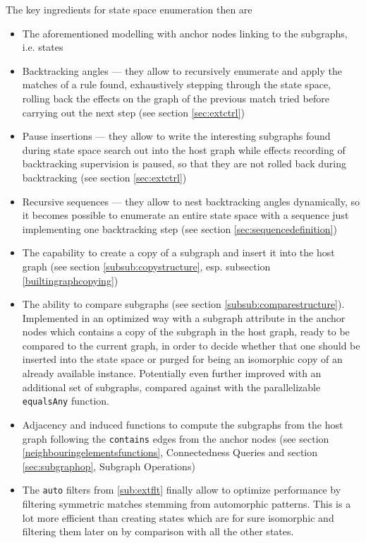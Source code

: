 The key ingredients for state space enumeration then are
\begin{itemize}
	\item The aforementioned modelling with anchor nodes linking to the subgraphs, i.e. states
	\item Backtracking angles --- they allow to recursively enumerate and apply the matches of a rule found, exhaustively stepping through the state space, rolling back the effects on the graph of the previous match tried before carrying out the next step (see section \ref{sec:extctrl})
	\item Pause insertions --- they allow to write the interesting subgraphs found during state space search out into the host graph while effects recording of backtracking supervision is paused, so that they are not rolled back during backtracking (see section \ref{sec:extctrl})
	\item Recursive sequences --- they allow to nest backtracking angles dynamically, so it becomes possible to enumerate an entire state space with a sequence just implementing one backtracking step (see section \ref{sec:sequencedefinition})
	\item The capability to create a copy of a subgraph and insert it into the host graph (see section \ref{subsub:copystructure}, esp. subsection \ref{builtingraphcopying})
	\item The ability to compare subgraphs (see section \ref{subsub:comparestructure}).
Implemented in an optimized way with a subgraph attribute in the anchor nodes which contains a copy of the subgraph in the host graph, ready to be compared to the current graph, in order to decide whether that one should be inserted into the state space or purged for being an isomorphic copy of an already available instance. Potentially even further improved with an additional set of subgraphs, compared against with the parallelizable \texttt{equalsAny} function.
	\item Adjacency and induced functions to compute the subgraphs from the host graph following the \texttt{contains} edges from the anchor nodes (see section \ref{neighbouringelementsfunctions}, Connectedness Queries and section \ref{sec:subgraphop}, Subgraph Operations)
	\item The \texttt{auto} filters from \ref{sub:extflt} finally allow to optimize performance by filtering symmetric matches stemming from automorphic patterns. This is a lot more efficient than creating states which are for sure isomorphic and filtering them later on by comparison with all the other states.
\end{itemize}

